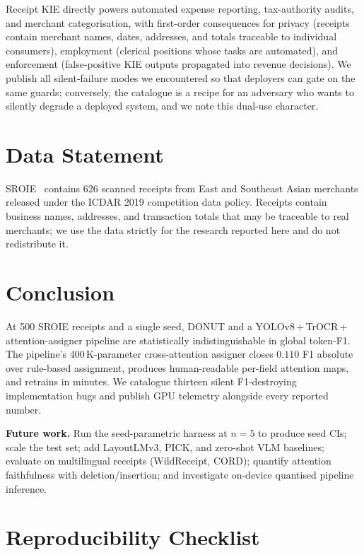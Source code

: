 \documentclass[conference]{IEEEtran}
\begin{document}
Receipt KIE directly powers automated expense reporting,
tax-authority audits, and merchant categorisation, with first-order
consequences for privacy (receipts contain merchant names, dates,
addresses, and totals traceable to individual consumers), employment
(clerical positions whose tasks are automated), and enforcement
(false-positive KIE outputs propagated into revenue decisions).
We publish all silent-failure modes we encountered so that deployers
can gate on the same guards; conversely, the catalogue is a recipe
for an adversary who wants to silently degrade a deployed system,
and we note this dual-use character.

\section*{Data Statement}

SROIE~\cite{huang2019icdar} contains 626 scanned receipts from East
and Southeast Asian merchants released under the ICDAR 2019
competition data policy.  Receipts contain business names,
addresses, and transaction totals that may be traceable to real
merchants; we use the data strictly for the research reported here
and do not redistribute it.


\section{Conclusion}

At 500 SROIE receipts and a single seed, DONUT and a
YOLOv8\,+\,TrOCR\,+\,attention-assigner pipeline are statistically
indistinguishable in global token-F1.  The pipeline's 400\,K-parameter
cross-attention assigner closes $0.110$ F1 absolute over
rule-based assignment, produces human-readable per-field attention
maps, and retrains in minutes.  We catalogue thirteen silent
F1-destroying implementation bugs and publish GPU telemetry alongside
every reported number.

\textbf{Future work.}
Run the seed-parametric harness at $n{=}5$ to produce seed CIs;
scale the test set; add LayoutLMv3, PICK, and zero-shot VLM
baselines; evaluate on multilingual receipts (WildReceipt, CORD);
quantify attention faithfulness with deletion/insertion; and
investigate on-device quantised pipeline inference.


\appendices

\section{Reproducibility Checklist}
\label{app:repro}
\end{document}
